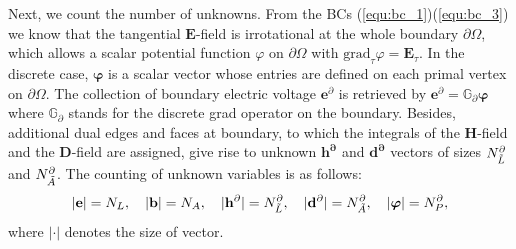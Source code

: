 \documentclass{report}
\begin{document}
Next, we count the number of unknowns. From the BCs (\ref{equ:bc_1})(\ref{equ:bc_3})  we know that the tangential $\mathbf{E}$-field is irrotational at the whole boundary $\partial\Omega$, which allows a scalar potential function $\varphi$ on $\partial \Omega$ with $\text{grad}_\tau \varphi = \mathbf{E}_\tau$. In the discrete case, $\bm{\varphi}$ is a scalar vector whose entries are defined on each primal vertex on $\partial \Omega$. The collection of boundary electric voltage $\mathbf{e}^\partial$ is retrieved by $\mathbf{e}^\partial = \mathbb{G}_\partial \bm{\varphi}$ where $\mathbb{G}_\partial$ stands for the discrete grad operator on the boundary. Besides, additional dual edges and faces at boundary, to which the integrals of the $\mathbf{H}$-field and the $\mathbf{D}$-field are assigned, give rise to unknown $\mathbf{h^\partial}$ and $\mathbf{d^\partial}$ vectors of sizes $N^\partial_{\Tilde{L}}$ and $N^\partial_{\Tilde{A}}$. The counting of unknown variables is as follows:
\begin{equation*}
    |\mathbf{e}| = N_L, \ \ \ |\mathbf{b}|=N_A, \ \ \ |\mathbf{h}^\partial|=N^\partial_{\Tilde{L}},\ \ \ |\mathbf{d}^\partial| = N^\partial_{\Tilde{A}}, \ \ \ |\bm{\varphi}| = N^\partial_P,
\end{equation*}
where $|\cdot|$ denotes the size of vector. 
\end{document}
